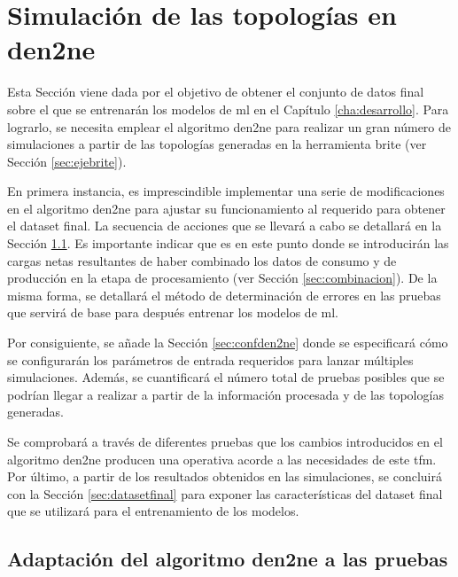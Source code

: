 \section{Simulación de las topologías en \acrshort{den2ne}}

Esta Sección viene dada por el objetivo de obtener el conjunto de datos final sobre el que se entrenarán los modelos de \gls{ml} en el Capítulo \ref{cha:desarrollo}. Para lograrlo, se necesita emplear el algoritmo \gls{den2ne} para realizar un gran número de simulaciones a partir de las topologías generadas en la herramienta \gls{brite} (ver Sección \ref{sec:ejebrite}). 

\vspace{3mm}

En primera instancia, es imprescindible implementar una serie de modificaciones en el algoritmo \gls{den2ne} para ajustar su funcionamiento al requerido para obtener el dataset final. La secuencia de acciones que se llevará a cabo se detallará en la Sección \ref{sec:cambiosden2ne}. Es importante indicar que es en este punto donde se introducirán las cargas netas resultantes de haber combinado los datos de consumo y de producción en la etapa de procesamiento (ver Sección \ref{sec:combinacion}). De la misma forma, se detallará el método de determinación de errores en las pruebas que servirá de base para después entrenar los modelos de \gls{ml}.

\vspace{3mm}

Por consiguiente, se añade la Sección \ref{sec:confden2ne} donde se especificará cómo se configurarán los parámetros de entrada requeridos para lanzar múltiples simulaciones. Además, se cuantificará el número total de pruebas posibles que se podrían llegar a realizar a partir de la información procesada y de las topologías generadas. 

\vspace{3mm}

Se comprobará a través de diferentes pruebas que los cambios introducidos en el algoritmo \gls{den2ne} producen una operativa acorde a las necesidades de este \gls{tfm}. Por último, a partir de los resultados obtenidos en las simulaciones, se concluirá con la Sección \ref{sec:datasetfinal} para exponer las características del dataset final que se utilizará para el entrenamiento de los modelos.




\subsection{Adaptación del algoritmo \acrshort{den2ne} a las pruebas}
\label{sec:cambiosden2ne}






